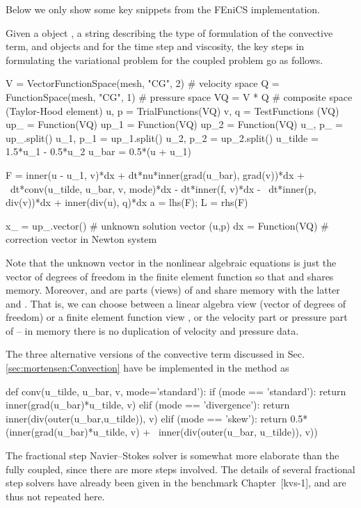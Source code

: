 Below we only show some key snippets from the FEniCS implementation.  

Given a  object , a string  describing the
type of formulation of the convective term, and  objects
 and  for the time step and viscosity, the key steps in formulating the variational
problem for the coupled problem go as follows.
\begin{python}
V = VectorFunctionSpace(mesh, "CG", 2)  # velocity space
Q = FunctionSpace(mesh, "CG", 1)        # pressure space
VQ = V * Q  # composite space (Taylor-Hood element)
u, p = TrialFunctions(VQ)
v, q = TestFunctions (VQ)
up_   = Function(VQ)
up_1  = Function(VQ)
up_2  = Function(VQ)
u_, p_ = up_.split()
u_1, p_1 = up_1.split()
u_2, p_2 = up_2.split()
u_tilde = 1.5*u_1 - 0.5*u_2
u_bar = 0.5*(u + u_1)
    
F  = inner(u - u_1, v)*dx + dt*nu*inner(grad(u_bar), grad(v))*dx + \
     dt*conv(u_tilde, u_bar, v, mode)*dx - dt*inner(f, v)*dx - \
     dt*inner(p, div(v))*dx + inner(div(u), q)*dx
a = lhs(F); L = rhs(F)

x_ = up_.vector()   # unknown solution vector (u,p)
dx = Function(VQ)  # correction vector in Newton system
\end{python}
Note that the unknown vector  in the nonlinear algebraic
equations is just the vector of degrees of freedom in the
 finite element function so that \emp{up\_} and 
shares memory. Moreover, \emp{u\_} and \emp{p\_} are parts (views)
of  and share memory with the latter and \emp{x\_}.
That is, we can choose between a linear algebra view \emp{x\_}
(vector of degrees of freedom) or a finite element function view ,
or the velocity part \emp{u\_} or pressure part \emp{p\_} of \emp{up\_} --
in memory there is no duplication of velocity and pressure data.

The three alternative versions of the convective term discussed in Sec. \ref{sec:mortensen:Convection} have be implemented in the method  as
\begin{python}
def conv(u_tilde, u_bar, v, mode='standard'):
    if (mode == 'standard'):
        return inner(grad(u_bar)*u_tilde, v)
    elif (mode == 'divergence'):
        return inner(div(outer(u_bar,u_tilde)), v)
    elif (mode == 'skew'):
        return 0.5*(inner(grad(u_bar)*u_tilde, v) + \
        inner(div(outer(u_bar, u_tilde)), v))
\end{python}
The fractional step Navier--Stokes solver is somewhat more elaborate than the fully coupled, since there are more steps involved. The details of several fractional step solvers have already been given in the benchmark Chapter~[kvs-1], and are thus not repeated here.

